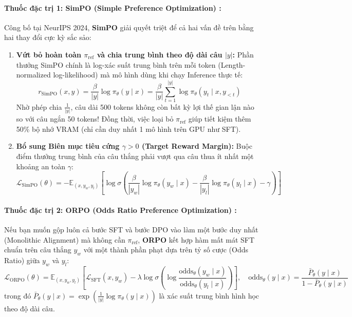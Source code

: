 \paragraph{Thuốc đặc trị 1: SimPO (Simple Preference Optimization) \citep{meng2024simpo}:}
Công bố tại NeurIPS 2024, \textbf{SimPO} giải quyết triệt để cả hai vấn đề trên bằng hai thay đổi cực kỳ sắc sảo:
\begin{enumerate}
  \item \textbf{Vứt bỏ hoàn toàn $\pi_{\text{ref}}$ và chia trung bình theo độ dài câu $|y|$:} Phần thưởng SimPO chính là log-xác suất trung bình trên mỗi token (Length-normalized log-likelihood) mà mô hình dùng khi chạy Inference thực tế:
  \begin{equation}
    r_{\text{SimPO}}(x, y) = \frac{\beta}{|y|} \log \pi_\theta(y \mid x) = \frac{\beta}{|y|} \sum_{t=1}^{|y|} \log \pi_\theta(y_t \mid x, y_{<t})
  \end{equation}
  Nhờ phép chia $\frac{1}{|y|}$, câu dài 500 tokens không còn bất kỳ lợi thế gian lận nào so với câu ngắn 50 tokens! Đồng thời, việc loại bỏ $\pi_{\text{ref}}$ giúp tiết kiệm thêm 50\% bộ nhớ VRAM (chỉ cần duy nhất 1 mô hình trên GPU như SFT).
  \item \textbf{Bổ sung Biên mục tiêu cứng $\gamma > 0$ (Target Reward Margin):} Buộc điểm thưởng trung bình của câu thắng phải vượt qua câu thua ít nhất một khoảng an toàn $\gamma$:
  \begin{equation}
    \mathcal{L}_{\text{SimPO}}(\theta) = -\mathbb{E}_{(x, y_w, y_l)} \left[ \log \sigma \left( \frac{\beta}{|y_w|} \log \pi_\theta(y_w \mid x) - \frac{\beta}{|y_l|} \log \pi_\theta(y_l \mid x) - \gamma \right) \right]
    \label{eq:simpo_loss}
  \end{equation}
\end{enumerate}

\paragraph{Thuốc đặc trị 2: ORPO (Odds Ratio Preference Optimization) \citep{hong2024orpo}:}
Nếu bạn muốn gộp luôn cả bước SFT và bước DPO vào làm một bước duy nhất (Monolithic Alignment) mà không cần $\pi_{\text{ref}}$, \textbf{ORPO} kết hợp hàm mất mát SFT chuẩn trên câu thắng $y_w$ với một thành phần phạt dựa trên tỷ số cược (Odds Ratio) giữa $y_w$ và $y_l$:
\begin{equation}
  \mathcal{L}_{\text{ORPO}}(\theta) = \mathbb{E}_{(x, y_w, y_l)} \left[ \mathcal{L}_{\text{SFT}}(x, y_w) - \lambda \log \sigma \left( \log \frac{\text{odds}_\theta(y_w \mid x)}{\text{odds}_\theta(y_l \mid x)} \right) \right], \quad \text{odds}_\theta(y \mid x) = \frac{\bar{P}_\theta(y \mid x)}{1 - \bar{P}_\theta(y \mid x)}
  \label{eq:orpo_loss}
\end{equation}
trong đó $\bar{P}_\theta(y \mid x) = \exp\left(\frac{1}{|y|} \log \pi_\theta(y \mid x)\right)$ là xác suất trung bình hình học theo độ dài câu.

